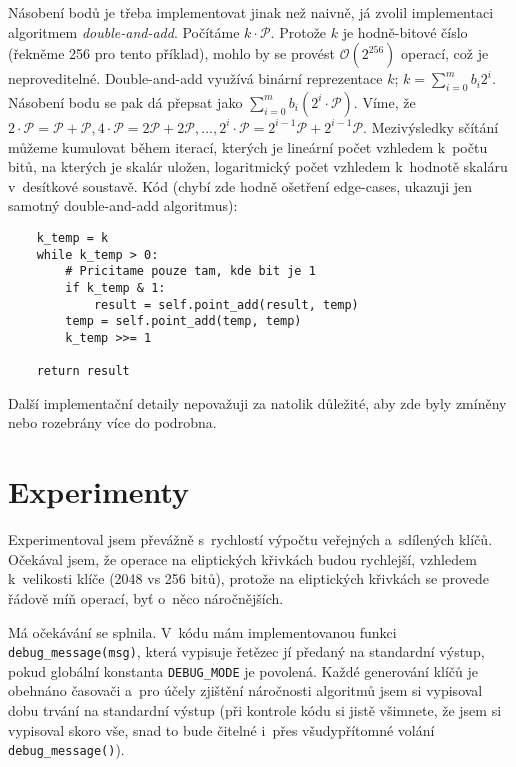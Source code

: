\documentclass[11pt, a4paper]{article}
\begin{document}
Násobení bodů je třeba implementovat jinak než naivně, já zvolil implementaci algoritmem \emph{double-and-add}.
Počítáme $k\cdot \mathcal{P}$.
Protože $k$ je hodně-bitové číslo (řekněme 256 pro tento příklad), mohlo by se provést $\mathcal{O}(2^{256})$ operací, což je neproveditelné.
Double-and-add využívá binární reprezentace $k$; $k = \sum_{i=0}^{m} b_i2^i$.
Násobení bodu se pak dá přepsat jako $\sum_{i=0}^{m} b_i(2^i \cdot \mathcal{P})$.
Víme, že $2 \cdot \mathcal{P} = \mathcal{P} + \mathcal{P}, 4 \cdot \mathcal{P} = 2\mathcal{P} + 2\mathcal{P}, \ldots, 2^i \cdot \mathcal{P} = 2^{i-1}\mathcal{P} + 2^{i-1}\mathcal{P}$.
Mezivýsledky sčítání můžeme kumulovat během iterací, kterých je lineární počet vzhledem k~počtu bitů, na kterých je skalár uložen, logaritmický počet vzhledem k~hodnotě skaláru v~desítkové soustavě.
Kód (chybí zde hodně ošetření edge-cases, ukazuji jen samotný double-and-add algoritmus):
\begin{verbatim}
    k_temp = k
    while k_temp > 0:
        # Pricitame pouze tam, kde bit je 1
        if k_temp & 1:
            result = self.point_add(result, temp)
        temp = self.point_add(temp, temp)
        k_temp >>= 1

    return result
\end{verbatim}

Další implementační detaily nepovažuji za natolik důležité, aby zde byly zmíněny nebo rozebrány více do podrobna.

\section{Experimenty}\label{kap:experimenty}

Experimentoval jsem převážně s~rychlostí výpočtu veřejných a~sdílených klíčů.
Očekával jsem, že operace na eliptických křivkách budou rychlejší, vzhledem k~velikosti klíče (2048 vs 256 bitů), protože na eliptických křivkách se provede řádově míň operací, byť o~něco náročnějších.

Má očekávání se splnila.
V~kódu mám implementovanou funkci \texttt{debug\_message(msg)}, která vypisuje řetězec jí předaný na standardní výstup, pokud globální konstanta \texttt{DEBUG\_MODE} je povolená.
Každé generování klíčů je obehnáno časovači a~pro účely zjištění náročnosti algoritmů jsem si vypisoval dobu trvání na standardní výstup (při kontrole kódu si jistě všimnete, že jsem si vypisoval skoro vše, snad to bude čitelné i~přes všudypřítomné volání \texttt{debug\_message()}).
\end{document}
